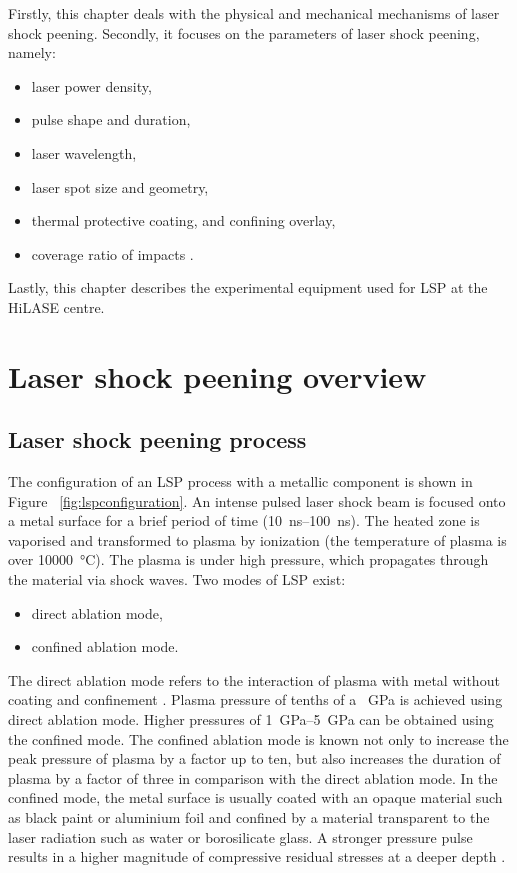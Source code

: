 Firstly, this chapter deals with the physical and mechanical mechanisms of laser shock peening. Secondly, it focuses on the parameters of laser shock peening, namely:

\begin{itemize}
    
    \item laser power density,
    \item pulse shape and duration,
    \item laser wavelength,
    \item laser spot size and geometry,
    \item thermal protective coating, and confining overlay,
    \item coverage ratio of impacts \cite{dane_2000}.

\end{itemize}

 Lastly, this chapter describes the experimental equipment used for LSP at the HiLASE centre. 


\section{Laser shock peening overview}

\subsection{Laser shock peening process}
The configuration of an LSP process with a metallic component is shown in Figure~ \ref{fig:lspconfiguration}. An intense pulsed laser shock beam is focused onto a metal surface for a brief period of time (\SIrange{10}{100}{\ns}). The heated zone is vaporised and transformed to plasma by ionization (the temperature of plasma is over \SI{10000}{\degreeCelsius}). The plasma is under high pressure, which propagates through the material via shock waves. Two modes of LSP exist: 

\begin{itemize}

    \item direct ablation mode,
    \item confined ablation mode.

\end{itemize}

The direct ablation mode refers to the interaction of plasma with metal without coating and confinement \cite{sano}. Plasma pressure of tenths of a \SI{}{\GPa} is achieved using direct ablation mode. Higher pressures of \SIrange{1}{5}{\GPa} can be obtained using the confined mode. The confined ablation mode is known not only to increase the peak pressure of plasma by a factor up to ten, but also increases the duration of plasma by a factor of three in comparison with the direct ablation mode. In the confined mode, the metal surface is usually coated with an opaque material such as black paint or aluminium foil and confined by a material transparent to the laser radiation such as water or borosilicate glass. A stronger pressure pulse results in a higher magnitude of compressive residual stresses at a deeper depth \cite{fairland}. 

